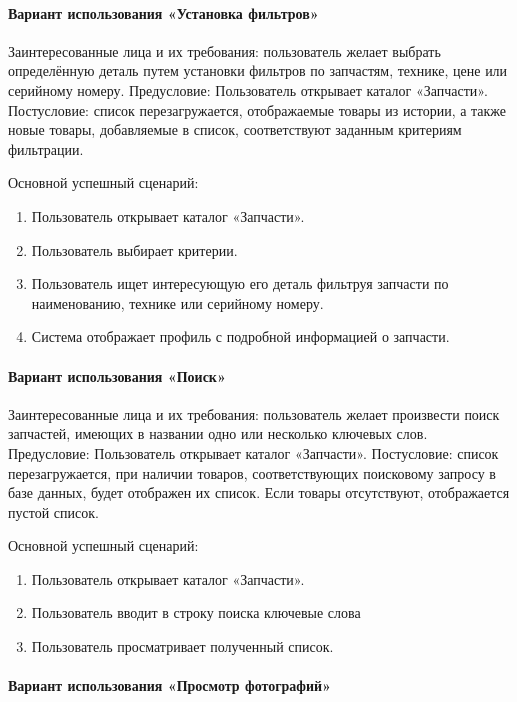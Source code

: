 \paragraph{Вариант использования «Установка фильтров»}

Заинтересованные лица и их требования: пользователь желает выбрать определённую деталь путем установки фильтров по запчастям, технике, цене или серийному номеру.
Предусловие: Пользователь открывает каталог «Запчасти».
Постусловие: список перезагружается, отображаемые товары из истории, а также новые товары, добавляемые в список, соответствуют заданным критериям фильтрации.

Основной успешный сценарий:
\begin{enumerate}
	\item Пользователь открывает каталог «Запчасти».
	\item Пользователь выбирает критерии.
	\item Пользователь ищет интересующую его деталь фильтруя запчасти по наименованию, технике или серийному номеру.
	\item Система отображает профиль с подробной информацией о запчасти.
\end{enumerate}

\paragraph{Вариант использования «Поиск»}

Заинтересованные лица и их требования: пользователь желает произвести поиск запчастей, имеющих в названии одно или несколько ключевых слов.
Предусловие: Пользователь открывает каталог «Запчасти».
Постусловие: список перезагружается, при наличии товаров, соответствующих поисковому запросу в базе данных, будет отображен их список. Если товары отсутствуют, отображается пустой список.

Основной успешный сценарий:

\begin{enumerate}
	\item Пользователь открывает каталог «Запчасти».
	\item Пользователь вводит в строку поиска ключевые слова
	\item Пользователь просматривает полученный список.
\end{enumerate}

\paragraph{Вариант использования «Просмотр фотографий»}

